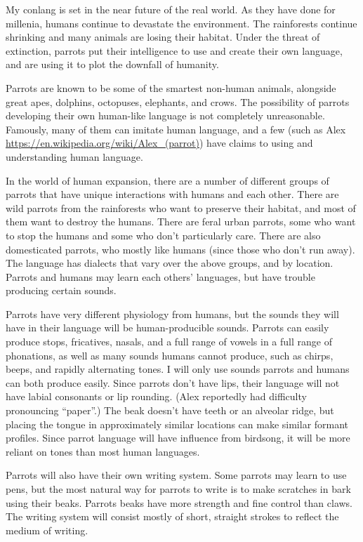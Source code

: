 \documentclass[12pt]{article}
\begin{document}
    My conlang is set in the near future of the real world.
    As they have done for millenia, humans continue to devastate the environment.
    The rainforests continue shrinking and many animals are losing their habitat.
    Under the threat of extinction,
    parrots put their intelligence to use and create their own language,
    and are using it to plot the downfall of humanity.

    Parrots are known to be some of the smartest non-human animals,
    alongside great apes, dolphins, octopuses, elephants, and crows.
    The possibility of parrots developing their own human-like language is not completely unreasonable.
    Famously, many of them can imitate human language,
    and a few (such as Alex \url{https://en.wikipedia.org/wiki/Alex_(parrot)})
    have claims to using and understanding human language.

    In the world of human expansion,
    there are a number of different groups of parrots that
    have unique interactions with humans and each other.
    There are wild parrots from the rainforests who want to preserve their habitat,
    and most of them want to destroy the humans.
    There are feral urban parrots,
    some who want to stop the humans and some who don't particularly care.
    There are also domesticated parrots,
    who mostly like humans (since those who don't run away).
    The language has dialects that vary over the above groups, and by location.
    Parrots and humans may learn each others' languages,
    but have trouble producing certain sounds.

    Parrots have very different physiology from humans,
    but the sounds they will have in their language will be human-producible sounds.
    Parrots can easily produce stops, fricatives, nasals, and a full range of vowels in a full range of phonations,
    as well as many sounds humans cannot produce, such as chirps, beeps, and rapidly alternating tones.
    I will only use sounds parrots and humans can both produce easily.
    Since parrots don't have lips, their language will not have labial consonants or lip rounding.
    (Alex reportedly had difficulty pronouncing ``paper''.)
    The beak doesn't have teeth or an alveolar ridge,
    but placing the tongue in approximately similar locations can make similar formant profiles.
    Since parrot language will have influence from birdsong,
    it will be more reliant on tones than most human languages.

    Parrots will also have their own writing system.
    Some parrots may learn to use pens, but
    the most natural way for parrots to write is to make scratches in bark using their beaks.
    Parrots beaks have more strength and fine control than claws.
    The writing system will consist mostly of short, straight strokes to reflect the medium of writing.
\end{document}
